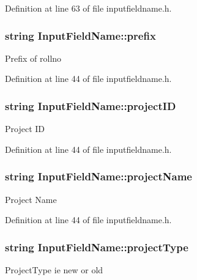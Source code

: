 \-Definition at line 63 of file inputfieldname.\-h.

\hypertarget{classInputFieldName_a161d155f8faca2c5dea1bbd607b17553}{
\subsubsection[{prefix}]{\setlength{\rightskip}{0pt plus 5cm}string {\bf \-Input\-Field\-Name\-::prefix}}}\label{dd/db2/classInputFieldName_a161d155f8faca2c5dea1bbd607b17553}
\-Prefix of rollno 

\-Definition at line 44 of file inputfieldname.\-h.

\hypertarget{classInputFieldName_ac4bd117f3137956473f1a1d5ce9106a5}{
\subsubsection[{project\-I\-D}]{\setlength{\rightskip}{0pt plus 5cm}string {\bf \-Input\-Field\-Name\-::project\-I\-D}}}\label{dd/db2/classInputFieldName_ac4bd117f3137956473f1a1d5ce9106a5}
\-Project \-I\-D 

\-Definition at line 44 of file inputfieldname.\-h.

\hypertarget{classInputFieldName_ab93b034743570810afe89aea88a7bbf6}{
\subsubsection[{project\-Name}]{\setlength{\rightskip}{0pt plus 5cm}string {\bf \-Input\-Field\-Name\-::project\-Name}}}\label{dd/db2/classInputFieldName_ab93b034743570810afe89aea88a7bbf6}
\-Project \-Name 

\-Definition at line 44 of file inputfieldname.\-h.

\hypertarget{classInputFieldName_aaa398a603dfe98f4eca022ec9d90bc09}{
\subsubsection[{project\-Type}]{\setlength{\rightskip}{0pt plus 5cm}string {\bf \-Input\-Field\-Name\-::project\-Type}}}\label{dd/db2/classInputFieldName_aaa398a603dfe98f4eca022ec9d90bc09}
\-Project\-Type ie new or old 

